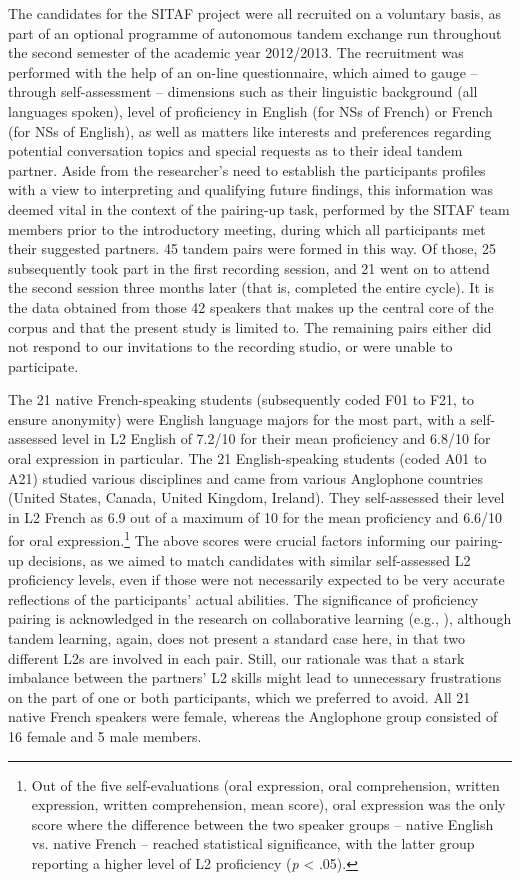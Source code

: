 \documentclass[output=paper,colorlinks,citecolor=brown,modfonts,nonflat]{../langscibook}
\begin{document}
The candidates for the SITAF project were all recruited on a voluntary basis, as part of an optional programme of autonomous tandem exchange run throughout the second semester of the academic year 2012/2013. The recruitment was performed with the help of an on-line questionnaire, which aimed to gauge – through self-assessment – dimensions such as their linguistic background (all languages spoken), level of proficiency in English (for NSs of French) or French (for NSs of English), as well as matters like interests and preferences regarding potential conversation topics and special requests as to their ideal tandem partner. Aside from the researcher’s need to establish the participants profiles with a view to interpreting and qualifying future findings, this information was deemed vital in the context of the pairing-up task, performed by the SITAF team members prior to the introductory meeting, during which all participants met their suggested partners. 45 tandem pairs were formed in this way. Of those, 25 subsequently took part in the first recording session, and 21 went on to attend the second session three months later (that is, completed the entire cycle). It is the data obtained from those 42 speakers that makes up the central core of the corpus and that the present study is limited to. The remaining pairs either did not respond to our invitations to the recording studio, or were unable to participate.

The 21 native French-speaking students (subsequently coded F01 to F21, to ensure anonymity) were English language majors for the most part, with a self-assessed level in L2 English of 7.2/10 for their mean proficiency and 6.8/10 for oral expression in particular. The 21 English-speaking students (coded A01 to A21) studied various disciplines and came from various Anglophone countries (United States, Canada, United Kingdom, Ireland). They self-assessed their level in L2 French as 6.9 out of a maximum of 10 for the mean proficiency and 6.6/10 for oral expression.\footnote{Out of the five self-evaluations (oral expression, oral comprehension, written expression, written comprehension, mean score), oral expression was the only score where the difference between the two speaker groups – native English vs. native French – reached statistical significance, with the latter group reporting a higher level of L2 proficiency (\textit{p} < .05).} The above scores were crucial factors informing our pairing-up decisions, as we aimed to match candidates with similar self-assessed L2 proficiency levels, even if those were not necessarily expected to be very accurate reflections of the participants’ actual abilities. The significance of proficiency pairing is acknowledged in the research on collaborative learning (e.g., \citealt{StorchAldosari2012}), although tandem learning, again, does not present a standard case here, in that two different L2s are involved in each pair. Still, our rationale was that a stark imbalance between the partners’ L2 skills might lead to unnecessary frustrations on the part of one or both participants, which we preferred to avoid. All 21 native French speakers were female, whereas the Anglophone group consisted of 16 female and 5 male members.
\end{document}
